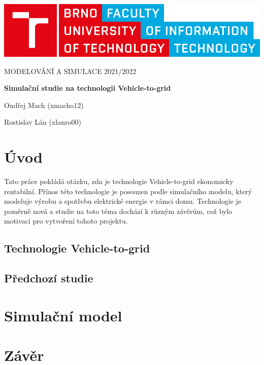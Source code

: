 \documentclass[12pt,a4paper]{article}
\begin{document}
\begin{titlepage}
\begin{center}
\includegraphics[width=0.5\linewidth]{img/logo.pdf}
\vspace{3cm}

\LARGE\uppercase{Modelování a simulace 2021/2022}
\vspace{1cm}

\LARGE\textbf{Simulační studie na technologii Vehicle-to-grid}

\vspace*{\fill}
\large{Ondřej Mach (xmacho12)}

\large{Rostislav Lán (xlanro00)}

\end{center}
\end{titlepage}


\setcounter{page}{1}
\tableofcontents
\clearpage


\section{Úvod}
Tato práce pokládá otázku, zda je technologie Vehicle-to-grid ekonomicky rentabilní.
Přínos této technologie je posouzen podle simulačního modelu, který modeluje výrobu a spotřebu elektrické energie v rámci domu.
Technologie je poměrně nová a studie na toto téma dochází k různým závěrům, což bylo motivací pro vytvoření tohoto projektu.

\subsection{Technologie Vehicle-to-grid}

\subsection{Předchozí studie}

\section{Simulační model}

\section{Závěr}
\end{document}
